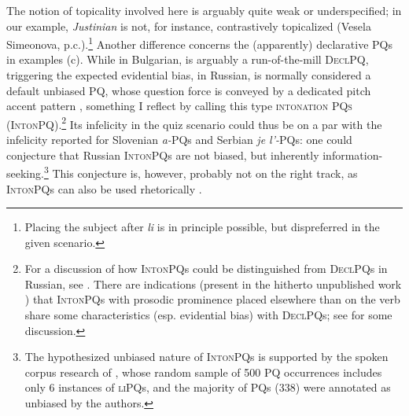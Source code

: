 \documentclass[output=paper,colorlinks,citecolor=brown]{langscibook}
\begin{document}
The notion of topicality involved here is arguably quite weak or underspecified; in our example, \textit{Justinian} is not, for instance, contrastively topicalized (Vesela Simeonova, p.c.).\footnote{Placing the subject after \textit{li} is in principle possible, but dispreferred in the given scenario.} Another difference concerns the (apparently) declarative PQs in examples (c). While in Bulgarian,  is arguably a run-of-the-mill \textsc{DeclPQ}, triggering the expected evidential bias, in Russian,  is normally considered a default unbiased PQ, whose question force is conveyed by a dedicated pitch accent pattern \citep{Ode1989,Meyer2004,Meyer.Mleinek2006}, something I reflect by calling this type \textsc{intonation PQs} (\textsc{IntonPQ}).\footnote{For a discussion of how \textsc{IntonPQ}s could be distinguished from \textsc{DeclPQ}s in Russian, see \citet{Meyer2004}. There are indications (present in the hitherto unpublished work \citealt{Esipova.Romero2023}) that \textsc{IntonPQ}s with prosodic prominence placed elsewhere than on the verb share some characteristics (esp. evidential bias) with \textsc{DeclPQ}s; see  for some discussion.\label{sim:fn:inter-decl-rus}} Its infelicity in the quiz scenario could thus be on a par with the infelicity reported for Slovenian \textit{a-}PQs and Serbian \textit{je l'-}PQs: one could conjecture that Russian \textsc{IntonPQ}s are not biased, but inherently information-seeking.\footnote{The hypothesized unbiased nature of \textsc{IntonPQ}s is supported by the spoken corpus research of \citet{Onoeva.Stankova2025}, whose random sample of 500 PQ occurrences includes only 6 instances of \textsc{liPQ}s, and the majority of PQs (338) were annotated as unbiased by the authors.} This conjecture is, however, probably not on the right track, as \textsc{IntonPQ}s can also be used rhetorically \citep{Esipova.Romero2023}.

\largerpage
\ea\label{sim:ex:just-bul}
\z\z
\end{document}
